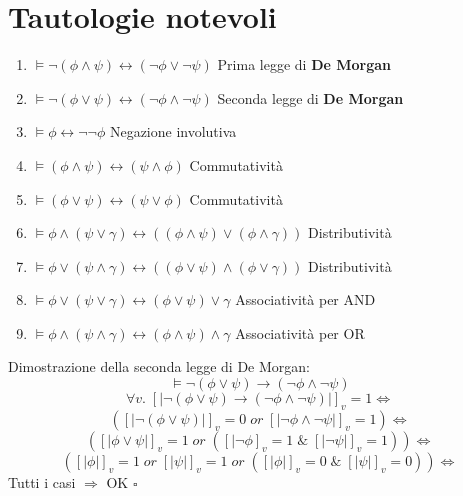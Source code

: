 \documentclass{article}
\theoremstyle{break}
\theoremstyle{break}
\theoremstyle{break}
\theoremstyle{break}
\begin{document}
\section{Tautologie notevoli}
\begin{enumerate}
    \item \( \models \neg (\phi \wedge \psi) \leftrightarrow (\neg \phi \vee \neg \psi) \) Prima legge di \textbf{De Morgan}
    \item \( \models \neg (\phi \vee \psi) \leftrightarrow (\neg \phi \wedge \neg \psi) \) Seconda legge di \textbf{De Morgan}
    \item \( \models \phi \leftrightarrow \neg \neg \phi \) Negazione involutiva
    \item \( \models (\phi \wedge \psi) \leftrightarrow (\psi \wedge \phi) \)  Commutatività
    \item \( \models (\phi \vee \psi) \leftrightarrow (\psi \vee \phi) \) Commutatività
    \item \( \models \phi \wedge (\psi \vee \gamma) \leftrightarrow ((\phi \wedge \psi) \vee (\phi \wedge \gamma)) \) Distributività
    \item \( \models \phi \vee (\psi \wedge \gamma) \leftrightarrow ((\phi \vee \psi) \wedge (\phi \vee \gamma)) \) Distributività
    \item \( \models \phi \vee (\psi \vee \gamma) \leftrightarrow (\phi \vee \psi) \vee \gamma \) Associatività per AND
    \item \( \models \phi \wedge (\psi \wedge \gamma) \leftrightarrow (\phi \wedge \psi) \wedge \gamma \) Associatività per OR
\end{enumerate}

\begin{exercise}
    Dimostrazione della seconda legge di De Morgan:
    \[
    \models \neg (\phi \vee \psi) \to (\neg \phi \wedge \neg \psi)
    \] 
    \[
        \forall v.\; [|\neg(\phi \vee \psi) \to (\neg \phi \wedge \neg \psi)|]_v=1 \Leftrightarrow
    \] 
    \[
        ([|\neg (\phi \vee \psi)|]_v=0\; or\; [|\neg \phi \wedge \neg \psi|]_v=1) \Leftrightarrow
    \] 
    \[
        ([|\phi \vee \psi|]_v = 1 \;or\; ([|\neg \phi]_v=1\; \&\; [|\neg \psi|]_v=1)) \Leftrightarrow
    \] 
    \[
        ([|\phi|]_v=1\;or\;[|\psi|]_v=1\;or\;( [|\phi|]_v=0\; \&\; [|\psi|]_v=0)) \Leftrightarrow
    \] 
    Tutti i casi \( \Rightarrow \) OK \( \square \)  
\end{exercise}
\end{document}
